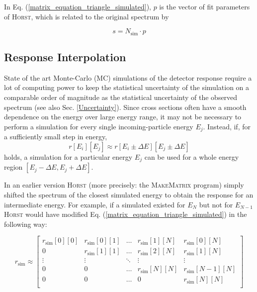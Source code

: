 \documentclass{article}
\begin{document}
\noindent In Eq. (\ref{matrix_equation_triangle_simulated}), $p$ is the vector of fit parameters of \textsc{Horst}, which is related to the original spectrum by

\begin{equation}
	\label{fit_parameters}
	s = N_\mathrm{sim} \cdot p
\end{equation}

\subsection{Response Interpolation}

State of the art Monte-Carlo (MC) simulations of the detector response require a lot of computing power to keep the statistical uncertainty of the simulation on a comparable order of magnitude as the statistical uncertainty of the observed spectrum (see also Sec. \ref{Uncertainty}).
Since cross sections often have a smooth dependence on the energy over large energy range, it may not be necessary to perform a simulation for every single incoming-particle energy $E_j$.
Instead, if, for a sufficiently small step in energy,
%
\begin{equation}
\label{weak_energy_dependence}
r[E_i][E_j] \approx r[E_i \pm \Delta E][E_j \pm \Delta E]
\end{equation}
%
\noindent holds, a simulation for a particular energy $E_j$ can be used for a whole energy region $\left[ E_j - \Delta E, E_j + \Delta E \right]$.

\noindent In an earlier version \textsc{Horst} (more precisely: the \textsc{MakeMatrix} program) simply shifted the spectrum of the closest simulated energy to obtain the response for an intermediate energy.
For example, if a simulated existed for $E_N$ but not for $E_{N-1}$ \textsc{Horst} would have modified Eq. (\ref{matrix_equation_triangle_simulated}) in the following way:

\begin{equation}
	\label{matrix_equation_triangle_approximation}
	r_\mathrm{sim} \approx 
	\begin{bmatrix}
		r_\mathrm{sim}[0][0] & r_\mathrm{sim}[0][1] & \hdots & r_\mathrm{sim}[1][N] & r_\mathrm{sim}[0][N]   \\
		0             & r_\mathrm{sim}[1][1] & \hdots & r_\mathrm{sim}[2][N] & r_\mathrm{sim}[1][N]   \\
		\vdots        & \vdots        & \ddots & \vdots        & \vdots          \\
		0             & 0             & \hdots & r_\mathrm{sim}[N][N] & r_\mathrm{sim}[N-1][N] \\
		0             & 0             & \hdots & 0             & r_\mathrm{sim}[N][N]   \\
	\end{bmatrix}
\end{equation}
\end{document}
